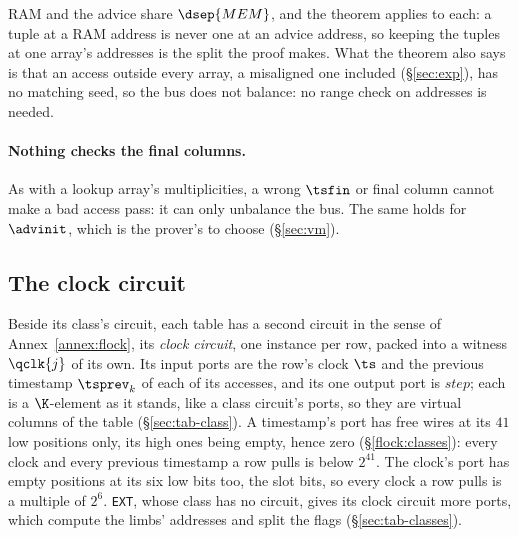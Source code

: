 RAM and the advice share $\dsep{MEM}$, and the theorem applies to each: a tuple at a RAM address is never one at an advice address, so keeping the tuples at one array's addresses is the split the proof makes. What the theorem also says is that an access outside every array, a misaligned one included (\S\ref{sec:exp}), has no matching seed, so the bus does not balance: no range check on addresses is needed.

\paragraph{Nothing checks the final columns.} As with a lookup array's multiplicities, a wrong $\tsfin$ or final column cannot make a bad access pass: it can only unbalance the bus. The same holds for $\advinit$, which is the prover's to choose (\S\ref{sec:vm}).

\subsection{The clock circuit}\label{sec:clock}

Beside its class's circuit, each table has a second circuit in the sense of Annex~\ref{annex:flock}, its \emph{clock circuit}, one instance per row, packed into a witness $\qclk{j}$ of its own. Its input ports are the row's clock $\ts$ and the previous timestamp $\tsprev_k$ of each of its accesses, and its one output port is $\mathit{step}$; each is a $\K$-element as it stands, like a class circuit's ports, so they are virtual columns of the table (\S\ref{sec:tab-class}). A timestamp's port has free wires at its $41$ low positions only, its high ones being empty, hence zero (\S\ref{flock:classes}): every clock and every previous timestamp a row pulls is below $2^{41}$. The clock's port has empty positions at its six low bits too, the slot bits, so every clock a row pulls is a multiple of $2^{6}$. \texttt{EXT}, whose class has no circuit, gives its clock circuit more ports, which compute the limbs' addresses and split the flags (\S\ref{sec:tab-classes}).

